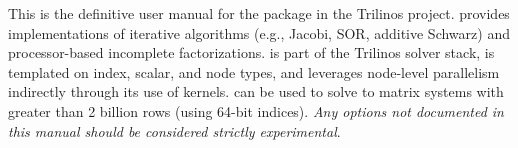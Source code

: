 This is the definitive user manual for the \ifpacktwo{} package in the Trilinos
project.  \ifpacktwo{} provides implementations of iterative algorithms (e.g.,
Jacobi, SOR, additive Schwarz) and processor-based incomplete factorizations.
\ifpacktwo{} is part of the Trilinos \tpetra{} solver stack, is templated on index,
scalar, and node types, and leverages node-level parallelism indirectly through
its use of \tpetra{} kernels.  \ifpacktwo{} can be used to solve to matrix systems
with greater than 2 billion rows (using 64-bit indices). \textit{Any options not documented in this
  manual should be considered strictly experimental}.
